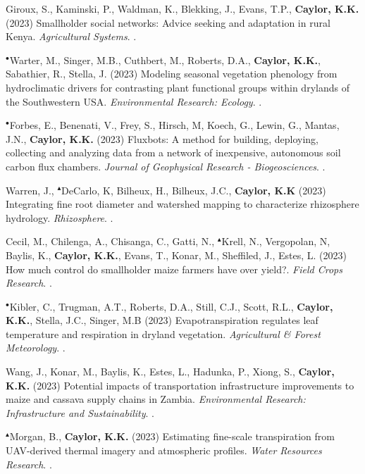 \begin{etaremune}
\item Giroux, S., Kaminski, P., Waldman, K., Blekking, J., Evans, T.P., \textbf{ Caylor, K.K.} (2023) Smallholder social networks: Advice seeking and adaptation in rural Kenya. \emph{Agricultural Systems}. .
\item $^{\bullet}$Warter, M., Singer, M.B., Cuthbert, M., Roberts, D.A., \textbf{ Caylor, K.K.}, Sabathier, R., Stella, J. (2023) Modeling seasonal vegetation phenology from hydroclimatic drivers for contrasting plant functional groups within drylands of the Southwestern USA. \emph{Environmental Research: Ecology}. .
\item $^{\bullet}$Forbes, E., Benenati, V., Frey, S., Hirsch, M, Koech, G., Lewin, G., Mantas, J.N., \textbf{ Caylor, K.K.} (2023) Fluxbots: A method for building, deploying, collecting and analyzing data from a network of inexpensive, autonomous soil carbon flux chambers. \emph{Journal of Geophysical Research - Biogeosciences}. .
\item Warren, J., $^{\blacktriangle}$DeCarlo, K, Bilheux, H., Bilheux, J.C., \textbf{ Caylor, K.K} (2023) Integrating fine root diameter and watershed mapping to characterize rhizosphere hydrology. \emph{Rhizosphere}. .
\item Cecil, M., Chilenga, A., Chisanga, C., Gatti, N., $^{\blacktriangle}$Krell, N., Vergopolan, N, Baylis, K., \textbf{ Caylor, K.K.}, Evans, T., Konar, M., Sheffiled, J., Estes, L. (2023) How much control do smallholder maize farmers have over yield?. \emph{Field Crops Research}. .
\item $^{\bullet}$Kibler, C., Trugman, A.T., Roberts, D.A., Still, C.J., Scott, R.L., \textbf{ Caylor, K.K.}, Stella, J.C., Singer, M.B (2023) Evapotranspiration regulates leaf temperature and respiration in dryland vegetation. \emph{Agricultural \& Forest Meteorology}. .
\item Wang, J., Konar, M., Baylis, K., Estes, L., Hadunka, P., Xiong, S., \textbf{ Caylor, K.K.} (2023) Potential impacts of transportation infrastructure improvements to maize and cassava supply chains in Zambia. \emph{Environmental Research: Infrastructure and Sustainability}. .
\item $^{\blacktriangle}$Morgan, B., \textbf{ Caylor, K.K.} (2023) Estimating fine-scale transpiration from UAV-derived thermal imagery and atmospheric profiles. \emph{Water Resources Research}. .


\end{etaremune}
